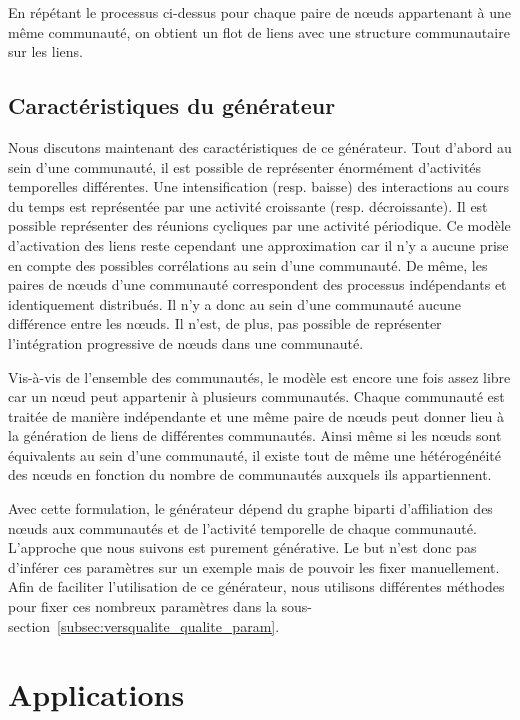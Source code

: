En répétant le processus ci-dessus pour chaque paire de n\oe uds appartenant à une même communauté, on obtient un flot de liens avec une structure communautaire sur les liens.

\subsection{Caractéristiques du générateur}

Nous discutons maintenant des caractéristiques de ce générateur.
Tout d'abord au sein d'une communauté, il est possible de représenter énormément d'activités temporelles différentes.
Une intensification (resp. baisse) des interactions au cours du temps est représentée par une activité croissante (resp. décroissante).
Il est possible représenter des réunions cycliques par une activité périodique. 
Ce modèle d'activation des liens reste  cependant une approximation car il n'y a aucune prise en compte des possibles corrélations au sein d'une communauté.
De même, les paires de n\oe uds d'une communauté correspondent des processus indépendants et identiquement distribués.
Il n'y a donc au sein d'une communauté aucune différence entre les n\oe uds.
Il n'est, de plus, pas possible de représenter l'intégration progressive de n\oe uds dans une communauté.

Vis-à-vis de l'ensemble des communautés, le modèle est encore une fois assez libre car un n\oe ud peut appartenir à plusieurs communautés.
Chaque communauté est traitée de manière indépendante et une même paire de n\oe uds peut donner lieu à la génération de liens de différentes communautés.
Ainsi même si les n\oe uds sont équivalents au sein d'une communauté, il existe tout de même une hétérogénéité des n\oe uds en fonction du nombre de communautés auxquels ils appartiennent.

\bigskip

Avec cette formulation, le générateur dépend du graphe biparti d'affiliation des n\oe uds aux communautés et de l'activité temporelle de chaque communauté.
L'approche que nous suivons est purement générative.
Le but n'est donc pas d'inférer ces paramètres sur un exemple mais de pouvoir les fixer manuellement.
Afin de faciliter l'utilisation de ce générateur, nous utilisons différentes méthodes pour fixer ces nombreux paramètres dans la sous-section~\ref{subsec:versqualite_qualite_param}.


\section{Applications}
\label{sec:versqualite_Applications}



